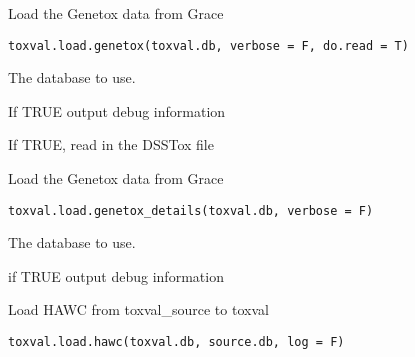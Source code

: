 \documentclass[letterpaper]{book}
\begin{document}
%
\begin{Description}\relax
Load the Genetox data from Grace
\end{Description}
%
\begin{Usage}
\begin{verbatim}
toxval.load.genetox(toxval.db, verbose = F, do.read = T)
\end{verbatim}
\end{Usage}
%
\begin{Arguments}
\begin{ldescription}
\item[\code{toxval.db}] The database to use.

\item[\code{verbose}] If TRUE output debug information

\item[\code{do.read}] If TRUE, read in the DSSTox file
\end{ldescription}
\end{Arguments}
%
\begin{Description}\relax
Load the Genetox data from Grace
\end{Description}
%
\begin{Usage}
\begin{verbatim}
toxval.load.genetox_details(toxval.db, verbose = F)
\end{verbatim}
\end{Usage}
%
\begin{Arguments}
\begin{ldescription}
\item[\code{toxval.db}] The database to use.

\item[\code{verbose}] if TRUE output debug information
\end{ldescription}
\end{Arguments}
%
\begin{Description}\relax
Load HAWC from toxval\_source to toxval
\end{Description}
%
\begin{Usage}
\begin{verbatim}
toxval.load.hawc(toxval.db, source.db, log = F)
\end{verbatim}
\end{Usage}
\end{document}
